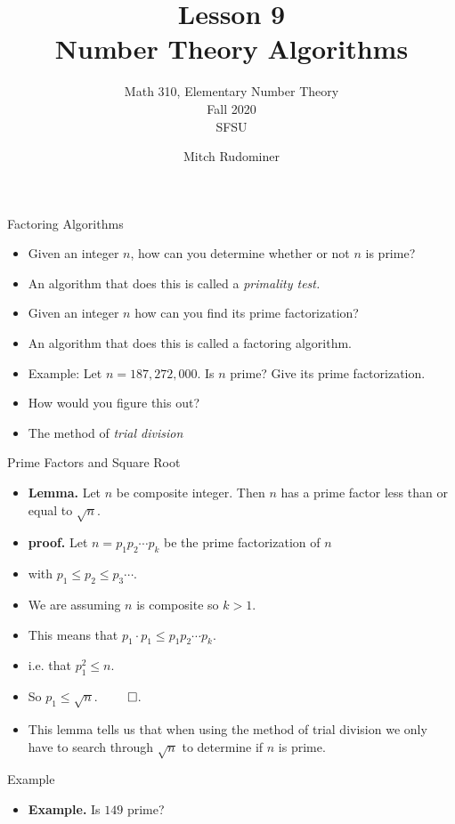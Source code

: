 \documentclass[handout]{beamer}
\title{Lesson 9 \\ Number Theory Algorithms}
\subtitle{Math 310, Elementary Number Theory \\ Fall 2020 \\ SFSU}
\author{Mitch Rudominer}
\date{}
\begin{document}
\begin{frame}
  \titlepage
\end{frame}

\begin{frame}{Factoring Algorithms}

\begin{itemize}
  \item Given an integer $n$, how can you determine whether or not $n$ is prime?
  \item An algorithm that does this is called a \emph{primality test.}
  \item Given an integer $n$ how can you find its prime factorization?
  \item An algorithm that does this is called a factoring algorithm.
  \item Example: Let $n=187,272,000$. Is $n$ prime? Give its prime factorization.
  \item How would you figure this out?
  \item The method of \emph{trial division}
\end{itemize}

\end{frame}

\begin{frame}{Prime Factors and Square Root}

\begin{itemize}
  \item \textbf{Lemma.} Let $n$ be composite integer. Then $n$ has a prime factor less than or equal to $\sqrt{n}$.
  \item \textbf{proof.} Let $n=p_1 p_2 \cdots p_k$ be the prime factorization of $n$
  \item with $p_1 \leq p_2 \leq p_3 \cdots$.
  \item We are assuming $n$ is composite so $k>1$.
  \item This means that $p_1 \cdot p_1 \leq p_1 p_2 \cdots p_k$.
  \item i.e. that $p_1^2 \leq n$.
  \item So $p_1 \leq \sqrt{n}.$ $\qed$.
  \item This lemma tells us that when using the method of trial division we only
  have to search through $\sqrt{n}$ to determine if $n$ is prime.
\end{itemize}
\end{frame}

\begin{frame}{Example}
\begin{itemize}
  \item \textbf{Example.} Is $149$ prime?
\end{itemize}

\end{frame}
\end{document}
